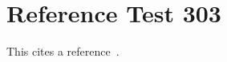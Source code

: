 \documentclass{article}
\begin{document}
\section{Reference Test 303}
This cites a reference~\cite{test303}.

\end{document}
